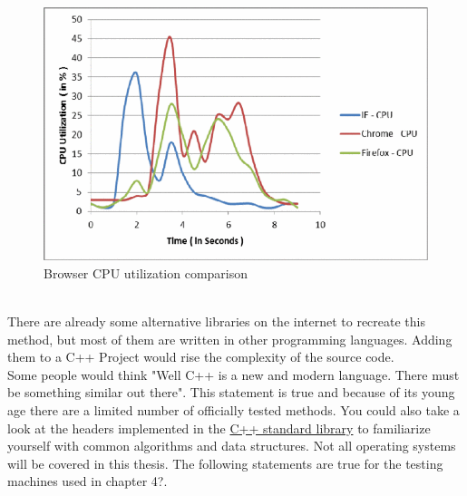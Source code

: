 \begin{figure}[h]
	\centering
	\includegraphics[scale=0.25]{figures/einleitung/browser_comparisson.png}
	\caption{Browser CPU utilization comparison\cite{6724273}}
	\label{browser_comp}
\end{figure}
\\
There are already some alternative libraries on the internet to recreate this method, but most of them are written in other programming languages. Adding them to a C++ Project would rise the complexity of the source code.\\
Some people would think "Well C++ is a new and modern language. There must be something similar out there". This statement is true and because of its young age there are a limited number of officially tested methods. You could also take a look at the headers implemented in the \href{https://en.cppreference.com/w/cpp/header}{C++ standard library} \cite{CppRef} to familiarize yourself with common algorithms and data structures.
Not all operating systems will be covered in this thesis.
The following statements are true for the testing machines used in chapter 4?.
